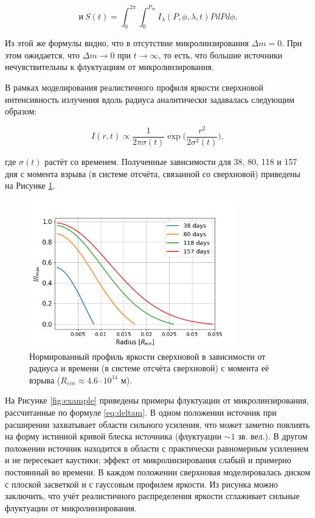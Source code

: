\begin{equation}\label{eq:sott}
\textrm{и} \ S(t) = \int_0^{2\pi} \int_0^{P_m} I_{\lambda}(P,\phi,\lambda, t) P dP d\phi.
\end{equation}


\noindent Из этой же формулы видно, что в отсутствие микролинзирования $\Delta m =0$. При этом ожидается, что $\Delta m \rightarrow 0$ при $t \rightarrow \infty$, то есть, что большие источники нечувствительны к флуктуациям от микролинзирования.

В рамках моделирования реалистичного профиля яркости сверхновой интенсивность излучения вдоль радиуса аналитически задавалась следующим образом:

\begin{equation}\label{eq:profile}
I(r,t) \propto \frac{1}{2\pi\sigma(t)}\exp\big({\frac{r^2}{2\sigma^2(t)}}\big),
\end{equation}

\noindent где $\sigma(t)$ растёт со временем. Полученные зависимости для 38, 80, 118 и 157 дня с момента взрыва (в системе отсчёта, связанной со сверхновой) приведены на Рисунке \ref{fig:profile}. %

\begin{figure}[H]
    \centering
	\includegraphics[width=0.8\textwidth]{microlensing/images/profile.png}
	\caption{Нормированный профиль яркости сверхновой в зависимости от радиуса и времени (в системе отсчёта сверхновой) с момента её взрыва ($R_{ein}\approx4.6\cdot10^{14}$ м).}
	\label{fig:profile}
\end{figure}

На Рисунке \ref{fig:example} приведены примеры флуктуации от микролинзирования, рассчитанные по формуле \eqref{eq:deltam}. В одном положении источник при расширении захватывает области сильного усиления, что может заметно повлиять на форму истинной кривой блеска источника (флуктуации $\sim 1$ зв. вел.). В другом положении источник находится в области с практически равномерным усилением и не пересекает каустики; эффект от микролинзирования слабый и примерно постоянный во времени. В каждом положении сверхновая моделировалась диском с плоской засветкой и с гауссовым профилем яркости. Из рисунка можно заключить, что учёт реалистичного распределения яркости сглаживает сильные флуктуации от микролинзирования.

